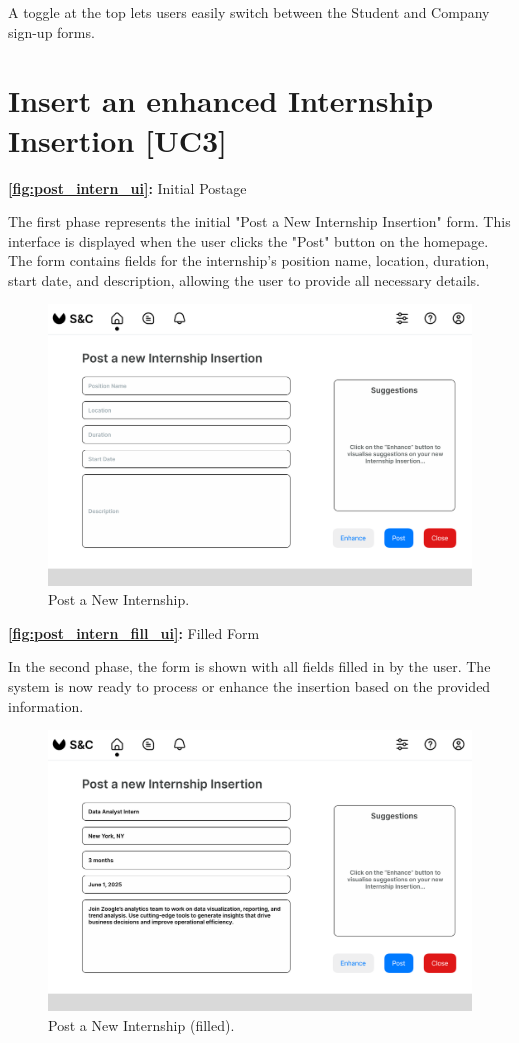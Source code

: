 A toggle at the top lets users easily switch between the Student and Company sign-up forms.

\newpage

\section{Insert an enhanced Internship Insertion [UC3]}
\label{sec:UI2_enhanced_intern}%


\textbf{\autoref{fig:post_intern_ui}:} Initial Postage

The first phase represents the initial "Post a New Internship Insertion" form. This interface is displayed when the user clicks the "Post" button on the homepage. The form contains fields for the internship's position name, location, duration, start date, and description, allowing the user to provide all necessary details.

\begin{figure}[H]
    \centering
    \includegraphics[width=0.75\linewidth]{DD/Images/UI/Postpage.png}
    \caption{Post a New Internship.}
    \label{fig:post_intern_ui}
\end{figure}

\textbf{\autoref{fig:post_intern_fill_ui}:} Filled Form

In the second phase, the form is shown with all fields filled in by the user. The system is now ready to process or enhance the insertion based on the provided information.

\begin{figure}[H]
    \centering
    \includegraphics[width=0.75\linewidth]{DD/Images/UI/Postpage_filledForm.png}
    \caption{Post a New Internship (filled).}
    \label{fig:post_intern_fill_ui}
\end{figure}


